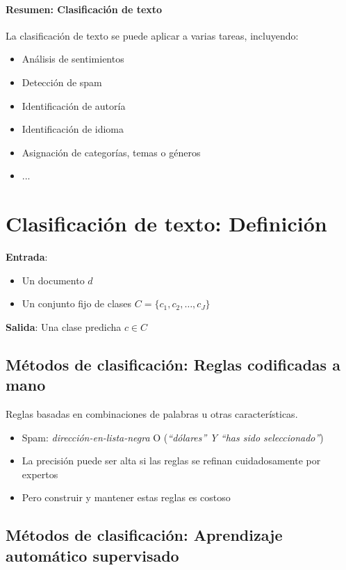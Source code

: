 \paragraph{Resumen: Clasificación de texto}

La clasificación de texto se puede aplicar a varias tareas, incluyendo:

\begin{itemize}
    \item Análisis de sentimientos
    \item Detección de spam
    \item Identificación de autoría
    \item Identificación de idioma
    \item Asignación de categorías, temas o géneros
    \item ...
\end{itemize}


\section{Clasificación de texto: Definición}

\textbf{Entrada}:
\begin{itemize}
    \item Un documento $d$
    \item Un conjunto fijo de clases $C = \{c_1, c_2, \ldots, c_J\}$
\end{itemize}

\textbf{Salida}: Una clase predicha $c \in C$


\subsection{Métodos de clasificación: Reglas codificadas a mano}

Reglas basadas en combinaciones de palabras u otras características.

\begin{itemize}
    \item Spam: \textit{dirección-en-lista-negra} O (\textit{“dólares” Y “has sido seleccionado”})
    \item La precisión puede ser alta si las reglas se refinan cuidadosamente por expertos
    \item Pero construir y mantener estas reglas es costoso
\end{itemize}

\subsection{Métodos de clasificación: Aprendizaje automático supervisado}

